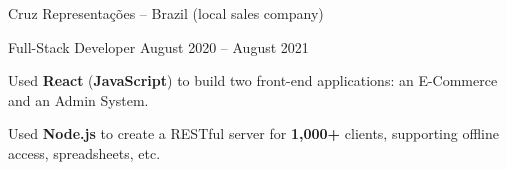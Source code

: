 \begin{entry}{Cruz Representações -- Brazil (local sales company)}

	\entryItem
		{Full-Stack Developer}
		{August 2020 -- August 2021}

		\begin{items}
			\item Used \textbf{React} (\textbf{JavaScript}) to build two front-end applications: an E-Commerce and an Admin System.
			\item Used \textbf{Node.js} to create a RESTful server for \textbf{1,000+} clients, supporting offline access, spreadsheets, etc.
		\end{items}
	
\end{entry}

